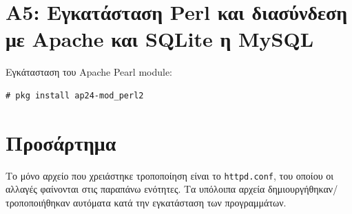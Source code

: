 \documentclass[12pt]{article}
\begin{document}
\section{Α5: Εγκατάσταση Perl και διασύνδεση με Apache και SQLite η MySQL}

Εγκάτασταση του Apache Pearl module:

\begin{lstlisting}
# pkg install ap24-mod_perl2
\end{lstlisting}

\section{Προσάρτημα}

Το μόνο αρχείο που χρειάστηκε τροποποίηση είναι το \lstinline{httpd.conf}, του
οποίου οι αλλαγές φαίνονται στις παραπάνω ενότητες. Τα υπόλοιπα αρχεία
δημιουργήθηκαν/τροποποιήθηκαν αυτόματα κατά την εγκατάσταση των προγραμμάτων.
\end{document}
